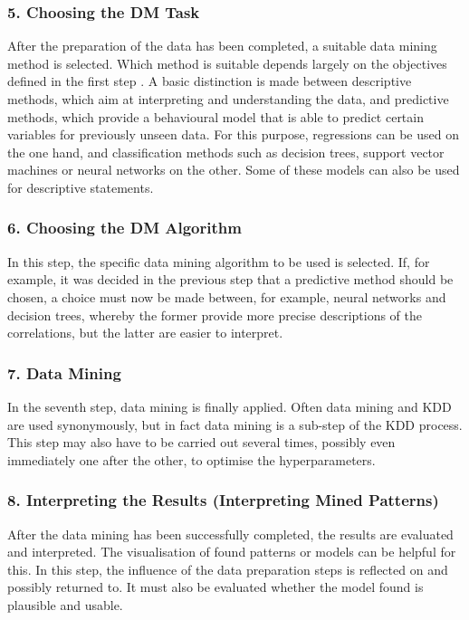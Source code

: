 \subsubsection{5. Choosing the DM Task}

After the preparation of the data has been completed, a suitable data mining method is selected. Which method is suitable depends largely on the objectives defined in the first step \cite{Fayyad:1996}. A basic distinction is made between descriptive methods, which aim at interpreting and understanding the data, and predictive methods, which provide a behavioural model that is able to predict certain variables for previously unseen data. For this purpose, regressions can be used on the one hand, and classification methods such as decision trees, support vector machines or neural networks on the other. Some of these models can also be used for descriptive statements. \cite{Maimon:2010}

\subsubsection{6. Choosing the DM Algorithm}

In this step, the specific data mining algorithm to be used is selected. If, for example, it was decided in the previous step that a predictive method should be chosen, a choice must now be made between, for example, neural networks and decision trees, whereby the former provide more precise descriptions of the correlations, but the latter are easier to interpret. \cite{Maimon:2010}

\subsubsection{7. Data Mining}

In the seventh step, data mining is finally applied. Often data mining and KDD are used synonymously, but in fact data mining is a sub-step of the KDD process. \cite{Fayyad:1996}
This step may also have to be carried out several times, possibly even immediately one after the other, 
to optimise the hyperparameters. \cite{Maimon:2010}

\subsubsection{8. Interpreting the Results (Interpreting Mined Patterns)}

After the data mining has been successfully completed, the results are evaluated and interpreted. The visualisation of found patterns or models can be helpful for this. In this step, the influence of the data preparation steps is reflected on and possibly returned to. It must also be evaluated whether the model found is plausible and usable. \cite{Fayyad:1996,Maimon:2010}

